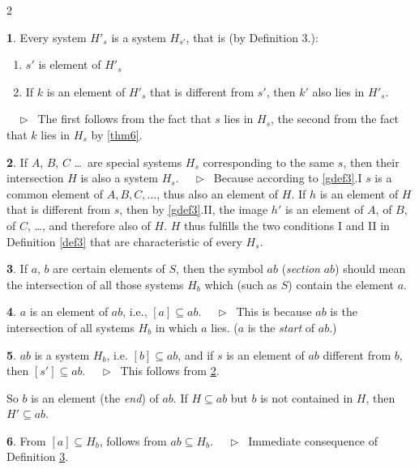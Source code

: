 \documentclass[leqno,hidelinks,10pt]{article}
\theoremstyle{definition}
\newtheorem{satz}{\protect\satzname}
\newtheorem{deff}[satz]{\protect\deffname}
\newcommand{\satzname}{}
\newcommand{\deffname}{}
\renewcommand{\satzname}{\hspace{-4pt}.\ Satz}%
\renewcommand{\deffname}{\hspace{-4pt}.\ Definition}%
\renewcommand{\satzname}{\hspace{-4pt}.\ Theorem}%
\renewcommand{\deffname}{\hspace{-4pt}.\ Definition}%
\newcommand\Beweis{\medskip \newline $ \phantom{'.'} \rhd \ $}%
\newcommand\beweis{ $ \phantom{'.'} \rhd \ $}%
\newcommand{\partof}{\subseteq}
\newcommand{\sref}[1]{\underline{\ref{#1}}}%
\begin{document}
\begin{paracol}{2}
\begin{rightcolumn}
\begin{satz}\label{thm7}
Every system $H'_s$ is a system $H_{s'}$, that is (by Definition 3.):
\begin{enumerate}[I$'$.]
	\item $s'$ is element of $H'_s$
	\item If $k$ is an element of $H'_s$ that is different from $s'$, then $k'$
    also lies in $H'_s$.
\end{enumerate}
\beweis
The first follows from the fact that $s$ lies in $H_s$, the second from the fact
that $k$ lies in $H_s$ by \sref{thm6}.
\end{satz}

\begin{satz}\label{thm8}
If $A$, $B$, $C$ \ldots\ are special systems $H_s$ corresponding to the same $s$,
then their intersection $H$ is also a system $H_s$.
\Beweis
Because according to \sref{gdef3}.I $s$ is a common element of
$A, B, C, \ldots$, thus also an element of $H$. If $h$ is an element of $H$ that
is different from $s$, then by \sref{gdef3}.II, the image $h'$
is an element of $A$, of $B$, of $C$, \ldots, and therefore also of $H$. $H$ thus
fulfills the two conditions I and II in Definition \sref{def3} that are
characteristic of every $H_s$.
\end{satz}

\begin{deff}\label{def9}
If $a$, $b$ are certain elements of $S$, then the symbol $ab$ (\emph{section} $ab$)
should mean the intersection of all those systems $H_b$ which (such as $S$)
contain the element $a$.%
\end{deff}

\newpage
\begin{satz}\label{thm10}
$a$ is an element of $ab$, i.e., $[a] \partof ab$.
\Beweis
This is because $ab$ is the intersection of all systems $H_b$ in which $a$ lies.
($a$ is the \emph{start} of $ab$.)
\end{satz}

\begin{satz}\label{thm11}
$ab$ is a system $H_b$, i.e. $[b] \partof ab$, and if $s$ is an element of $ab$
different from $b$, then $[s'] \partof ab$.
\Beweis
This follows from \sref{thm8}.
\end{satz}

So $b$ is an element (the \emph{end}) of $ab$. If $H \partof ab$ but $b$ is not
contained in $H$, then $H' \partof ab$.

\begin{satz}\label{thm12}
From $[a] \partof H_b$, follows from $ab \partof H_b$.
\Beweis
Immediate consequence of Definition \sref{def9}.
\end{satz}


\end{rightcolumn}
\end{paracol}
\end{document}
